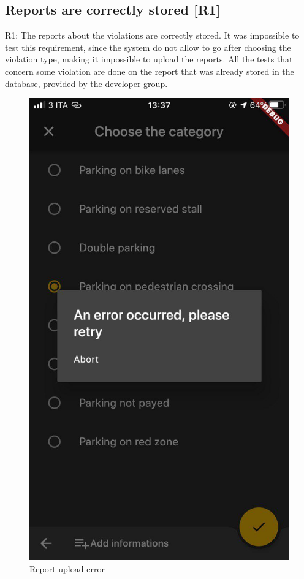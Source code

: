 \documentclass[../ATD.tex]{subfiles}
\begin{document}
    \subsection{Reports are correctly stored [R1]}\label{subsec:report-are-correctly-stored}
    R1: The reports about the violations are correctly stored.
    \newline
    It was impossible to test this requirement, since the system do not allow to go after choosing the violation type, making it impossible to upload the reports.
    All the tests that concern some violation are done on the report that was already stored in the database, provided by the developer group.
    \begin{figure}[H]
        \centering
        \includegraphics{../assets/report_upload_error.png}
        \caption{Report upload error}
    \end{figure}
\end{document}
